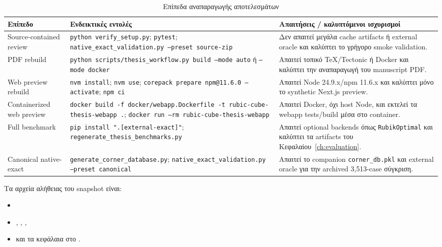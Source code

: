 \begin{table}[htbp]
\centering
\caption{Επίπεδα αναπαραγωγής αποτελεσμάτων}
\label{tab:reproduction_tiers}
\begin{tabularx}{\textwidth}{>{\RaggedRight\arraybackslash}p{3.2cm} >{\RaggedRight\arraybackslash}p{5.2cm} Y}
\toprule
\textbf{Επίπεδο} & \textbf{Ενδεικτικές εντολές} & \textbf{Απαιτήσεις / καλυπτόμενοι ισχυρισμοί} \\
\midrule
Source-contained review & \texttt{python verify\_setup.py}; \texttt{pytest}; \texttt{native\_exact\_validation.py --preset source-zip} & Δεν απαιτεί μεγάλα cache artifacts ή external oracle και καλύπτει το γρήγορο smoke validation. \\
PDF rebuild & \texttt{python scripts/thesis\_workflow.py build --mode auto} ή \texttt{--mode docker} & Απαιτεί τοπικό TeX/Tectonic ή Docker και καλύπτει την αναπαραγωγή του manuscript PDF. \\
Web preview rebuild & \texttt{nvm install}; \texttt{nvm use}; \texttt{corepack prepare npm@11.6.0 --activate}; \texttt{npm ci} & Απαιτεί Node 24.9.x/npm 11.6.x και καλύπτει μόνο το synthetic Next.js preview. \\
Containerized web preview & \texttt{docker build -f docker/webapp.Dockerfile -t rubic-cube-thesis-webapp .}; \texttt{docker run --rm rubic-cube-thesis-webapp} & Απαιτεί Docker, όχι host Node, και εκτελεί τα webapp tests/build μέσα στο container. \\
Full benchmark & \texttt{pip install ".[external-exact]"}; \texttt{regenerate\_thesis\_benchmarks.py} & Απαιτεί optional backends όπως \texttt{RubikOptimal} και καλύπτει τα artifacts του Κεφαλαίου~\ref{ch:evaluation}. \\
Canonical native-exact & \texttt{generate\_corner\_database.py}; \texttt{native\_exact\_validation.py --preset canonical} & Απαιτεί το companion \texttt{corner\_db.pkl} και external oracle για την archived 3,513-case σύγκριση. \\
\bottomrule
\end{tabularx}
\end{table}

Τα αρχεία αλήθειας του snapshot είναι:
\begin{itemize}
    \item {}
    \item {},
    ,
    ,
    \item {} και τα κεφάλαια στο .
\end{itemize}

